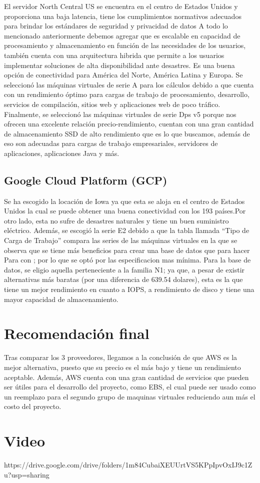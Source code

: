 \documentclass{article}
\begin{document}
El servidor North Central US se encuentra en el centro de Estados Unidos y proporciona una baja latencia, tiene los cumplimientos normativos adecuados para brindar los estándares de seguridad y privacidad de datos
A todo lo mencionado anteriormente debemos agregar que es escalable en capacidad de procesamiento y almacenamiento en función de las necesidades de los usuarios, también cuenta con una arquitectura hibrida que permite a los usuarios implementar soluciones de alta disponibilidad ante desastres.
Es una buena opción de conectividad para América del Norte, América Latina y Europa.
Se seleccionó las máquinas virtuales de serie A para los cálculos debido a que cuenta con un rendimiento óptimo para cargas de trabajo de procesamiento, desarrollo, servicios de compilación, sitios web y aplicaciones web de poco tráfico.\cite{microsoft_vms}
Finalmente, se seleccionó las máquinas virtuales de serie Dps v5 porque nos ofrecen una excelente relación precio-rendimiento, cuentan con una gran cantidad de almacenamiento SSD de alto rendimiento que es lo que buscamos, además de eso son adecuadas para cargas de trabajo empresariales, servidores de aplicaciones, aplicaciones Java y más.



  \subsection{Google Cloud Platform (GCP)}
  Se ha escogido la locación de Iowa ya que esta se aloja en el centro de Estados Unidos la cual se puede obtener una buena conectividad con los 193 países.Por otro lado, esta no sufre de desastres naturales y tiene un buen suministro eléctrico.
Además, se escogió la serie E2 debido a que la tabla llamada “Tipo de Carga de Trabajo”\cite{google_machine_types} compara  las series de las  máquinas virtuales en la que se observa  que se tiene más beneficios para crear una base de datos que para hacer 
Para con
 ; por lo que se optó por las especificacion mas mínima.
Para la base de datos, se eligio aquella perteneciente a la familia N1; ya que, a pesar de existir alternativas más baratas (por una diferencia de 639.54 dolares), esta es la que tiene un mejor rendimiento en cuanto a IOPS, a rendimiento de disco y tiene una mayor capacidad de almacenamiento.

\section{Recomendación final}

Tras comparar los 3 proveedores, llegamos a la conclusión de que AWS es la mejor alternativa, puesto que su precio es el más bajo y tiene un rendimiento aceptable. Además, AWS cuenta con una gran cantidad de servicios que pueden ser útiles para el desarrollo del proyecto, como EBS, el cual puede ser usado como un reemplazo para el segundo grupo de maquinas virtuales reduciendo aun más el costo del proyecto.

\section{Video}
https://drive.google.com/drive/folders/1m84CubaiXEUUrtVS5KPpIpvOxIJ9c1Zu?usp=sharing

\printbibliography
\end{document}
